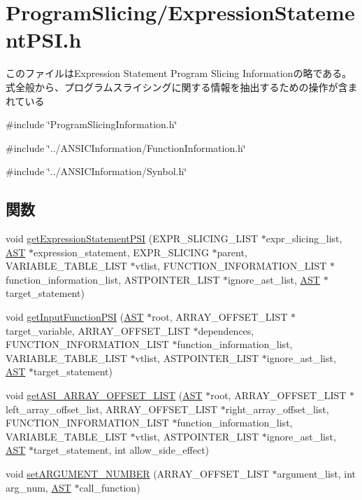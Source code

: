 \section{ProgramSlicing/ExpressionStatementPSI.h}
\label{ExpressionStatementPSI_8h}


このファイルはExpression Statement Program Slicing Informationの略である。 式全般から、プログラムスライシングに関する情報を抽出するための操作が含まれている  


{\ttfamily \#include \char`\"{}ProgramSlicingInformation.h\char`\"{}}\par
{\ttfamily \#include \char`\"{}../ANSICInformation/FunctionInformation.h\char`\"{}}\par
{\ttfamily \#include \char`\"{}../ANSICInformation/Synbol.h\char`\"{}}\par
\subsection*{関数}
\begin{DoxyCompactItemize}
\item 
void \hyperlink{ExpressionStatementPSI_8h_a21338dbe2da2ce130f96a703c328b101}{getExpressionStatementPSI} (EXPR\_\-SLICING\_\-LIST $\ast$expr\_\-slicing\_\-list, \hyperlink{structabstract__syntax__tree}{AST} $\ast$expression\_\-statement, EXPR\_\-SLICING $\ast$parent, VARIABLE\_\-TABLE\_\-LIST $\ast$vtlist, FUNCTION\_\-INFORMATION\_\-LIST $\ast$function\_\-information\_\-list, ASTPOINTER\_\-LIST $\ast$ignore\_\-ast\_\-list, \hyperlink{structabstract__syntax__tree}{AST} $\ast$target\_\-statement)
\item 
void \hyperlink{ExpressionStatementPSI_8h_a9ad98d9ff8db24ebafe23bbbfa6eae26}{getInputFunctionPSI} (\hyperlink{structabstract__syntax__tree}{AST} $\ast$root, ARRAY\_\-OFFSET\_\-LIST $\ast$target\_\-variable, ARRAY\_\-OFFSET\_\-LIST $\ast$dependences, FUNCTION\_\-INFORMATION\_\-LIST $\ast$function\_\-information\_\-list, VARIABLE\_\-TABLE\_\-LIST $\ast$vtlist, ASTPOINTER\_\-LIST $\ast$ignore\_\-ast\_\-list, \hyperlink{structabstract__syntax__tree}{AST} $\ast$target\_\-statement)
\item 
void \hyperlink{ExpressionStatementPSI_8h_a5fa8837a82cd901ff558fdfac5a83808}{getASI\_\-ARRAY\_\-OFFSET\_\-LIST} (\hyperlink{structabstract__syntax__tree}{AST} $\ast$root, ARRAY\_\-OFFSET\_\-LIST $\ast$left\_\-array\_\-offset\_\-list, ARRAY\_\-OFFSET\_\-LIST $\ast$right\_\-array\_\-offset\_\-list, FUNCTION\_\-INFORMATION\_\-LIST $\ast$function\_\-information\_\-list, VARIABLE\_\-TABLE\_\-LIST $\ast$vtlist, ASTPOINTER\_\-LIST $\ast$ignore\_\-ast\_\-list, \hyperlink{structabstract__syntax__tree}{AST} $\ast$target\_\-statement, int allow\_\-side\_\-effect)
\item 
void \hyperlink{ExpressionStatementPSI_8h_a3edc8c77cb40c3d9876beebeb0888645}{setARGUMENT\_\-NUMBER} (ARRAY\_\-OFFSET\_\-LIST $\ast$argument\_\-list, int arg\_\-num, \hyperlink{structabstract__syntax__tree}{AST} $\ast$call\_\-function)
\end{DoxyCompactItemize}


